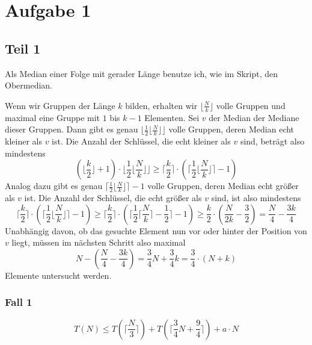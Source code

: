 \documentclass[10pt,a4paper]{article}
\begin{document}
\section{Aufgabe 1}

\subsection{Teil 1}

Als Median einer Folge mit gerader Länge benutze ich, wie im Skript, den Obermedian.

Wenn wir Gruppen der Länge $k$ bilden, erhalten wir $\lfloor \frac{N}{k} \rfloor$ volle Gruppen und maximal eine Gruppe mit $1$ bis $k - 1$ Elementen.
Sei $v$ der Median der Mediane dieser Gruppen.
Dann gibt es genau $\lfloor \frac{1}{2} \lfloor \frac{N}{k} \rfloor \rfloor$ volle Gruppen, deren Median echt kleiner als $v$ ist.
Die Anzahl der Schlüssel, die echt kleiner als $v$ sind, beträgt also mindestens
\begin{equation}
  (\lfloor \frac{k}{2} \rfloor + 1) \cdot \lfloor \frac{1}{2} \lfloor \frac{N}{k} \rfloor \rfloor \ge \lceil \frac{k}{2} \rceil \cdot (\lceil \frac{1}{2} \lfloor \frac{N}{k} \rfloor \rceil - 1)
\end{equation}
Analog dazu gibt es genau $\lceil \frac{1}{2} \lfloor \frac{N}{k} \rfloor \rceil - 1$ volle Gruppen, deren Median echt größer als $v$ ist.
Die Anzahl der Schlüssel, die echt größer als $v$ sind, ist also mindestens
\begin{equation}
  \lceil \frac{k}{2} \rceil \cdot (\lceil \frac{1}{2} \lfloor \frac{N}{k} \rfloor \rceil - 1) \ge \lceil \frac{k}{2} \rceil \cdot (\lceil \frac{1}{2} \lceil \frac{N}{k} \rceil - \frac{1}{2} \rceil - 1) \ge \frac{k}{2} \cdot \left( \frac{N}{2k} - \frac{3}{2} \right) = \frac{N}{4} - \frac{3k}{4}
\end{equation}
Unabhängig davon, ob das gesuchte Element nun vor oder hinter der Position von $v$ liegt, müssen im nächsten Schritt also maximal
\begin{equation}
  N - (\frac{N}{4} - \frac{3k}{4}) = \frac{3}{4}N + \frac{3}{4}k = \frac{3}{4} \cdot (N + k)
\end{equation}
Elemente untersucht werden.

\subsubsection{Fall 1}
\begin{equation}
  T(N) \le T(\lceil \frac{N}{3} \rceil) + T(\lceil \frac{3}{4}N + \frac{9}{4} \rceil) + a \cdot N
\end{equation}
\end{document}
